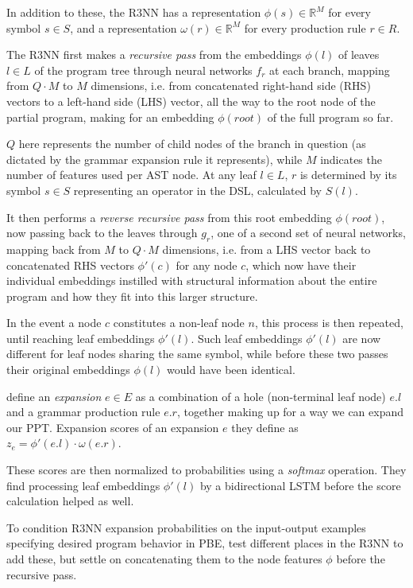 \documentclass{article}
\begin{document}
In addition to these, the R3NN has a representation $\phi(s) \in \mathbb{R}^M$ for every symbol $s \in S$,
and a representation $\omega(r) \in \mathbb{R}^M$ for every production rule $r \in R$.

The R3NN first makes a \emph{recursive pass} from the embeddings $\phi(l)$ of leaves $l \in L$ of the program tree through neural networks $f_r$ at each branch,
mapping from $Q \cdot M$ to $M$ dimensions,
i.e. from concatenated right-hand side (RHS) vectors to a left-hand side (LHS) vector,
all the way to the root node of the partial program,
making for an embedding $\phi(root)$ of the full program so far.

$Q$ here represents the number of child nodes of the branch in question
(as dictated by the grammar expansion rule it represents),
while $M$ indicates the number of features used per AST node.
At any leaf $l \in L$, $r$ is determined by its symbol $s \in S$
representing an operator in the DSL, calculated by $S(l)$.

It then performs a \emph{reverse recursive pass} from this root embedding $\phi(root)$,
now passing back to the leaves through $g_r$,
one of a second set of neural networks,
mapping back from $M$ to $Q \cdot M$ dimensions,
i.e. from a LHS vector back to concatenated RHS vectors $\phi'(c)$ for any node $c$,
which now have their individual embeddings instilled with structural information about the entire program and how they fit into this larger structure.

In the event a node $c$ constitutes a non-leaf node $n$,
this process is then repeated, until reaching leaf embeddings $\phi'(l)$.
Such leaf embeddings $\phi'(l)$ are now different for leaf nodes sharing the same symbol,
while before these two passes their original embeddings $\phi(l)$ would have been identical.

\citet{nsps} define an \emph{expansion} $e \in E$ as a combination of a hole (non-terminal leaf node) $e.l$ and a grammar production rule $e.r$, together making up for a way we can expand our PPT.
Expansion scores of an expansion $e$ they define as $z_e = \phi'(e.l) \cdot \omega(e.r)$.

These scores are then normalized to probabilities using a \emph{softmax} operation.
They find processing leaf embeddings $\phi'(l)$ by a bidirectional LSTM before the score calculation helped as well.

To condition R3NN expansion probabilities on the input-output examples specifying desired program behavior in PBE,
\citet{nsps} test different places in the R3NN to add these,
but settle on concatenating them to the node features $\phi$ before the recursive pass.
\end{document}

